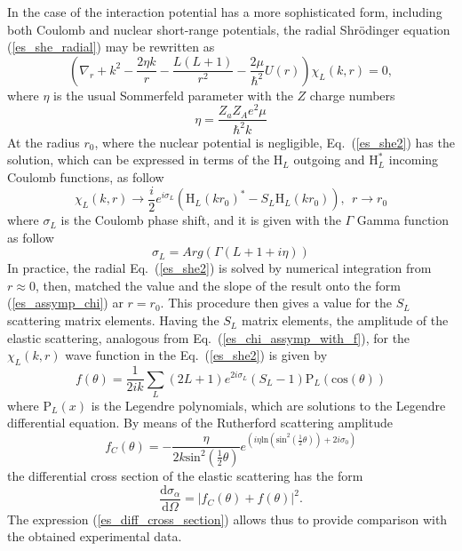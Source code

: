 \documentclass[
12pt, %
oneside, %
english, %
onehalfspacing, %
onehalfspacing, %
headsepline, %
]{MastersDoctoralThesis} %
\begin{document}
In the case of the interaction potential has a more sophisticated form, including both Coulomb and nuclear short-range  potentials, the radial Shr\"{o}dinger equation (\ref{es_she_radial}) may be rewritten as
\begin{equation}
\left( \nabla_r + k^2 - \frac{2 \eta k}{r} - \frac{L(L+1)}{r^2} - \frac{2 \mu}{\hbar^2} U \left( r \right) \right) \chi_L \left( k,r \right) =0,
\label{es_she2}
\end{equation}
where $\eta$ is the usual Sommerfeld parameter with the $Z$ charge numbers
\begin{equation*}
\eta=\frac{Z_a Z_A e^2 \mu}{\hbar^2 k}
\end{equation*}
At the radius $r_0$, where the nuclear potential is negligible, Eq.~(\ref{es_she2}) has the solution, which can be expressed in terms of the $\text{H}_L$ outgoing  and $\text{H}_L^*$ incoming Coulomb functions, as follow
\begin{equation}
\chi_L \left( k,r \right) \rightarrow \frac{i}{2}e^{i \sigma_L} \left( \text{H}_L(kr_0)^*
-S_L \text{H}_L(kr_0)\right), 
~~ r \rightarrow r_0
\label{es_assymp_chi}
\end{equation} 
where $\sigma_L$ is the Coulomb phase shift, and it is given with the $\Gamma$ Gamma function as follow
\begin{equation*}
\sigma_L=Arg\left( \Gamma \left( L+1+i \eta \right) \right)
\end{equation*}
In practice, the radial Eq.~(\ref{es_she2}) is solved by numerical integration from $r \approx 0$, then, matched the value and the slope of the result onto the form (\ref{es_assymp_chi}) ar $r=r_0$. This procedure then gives a value for the $S_L$ scattering matrix elements. Having the $S_L$ matrix elements, the amplitude  of the elastic scattering, analogous  from Eq.~(\ref{es_chi_assymp_with_f}), for the $\chi_L \left( k,r \right)$ wave function in the Eq.~(\ref{es_she2}) is given by
\begin{equation}
f(\theta)=\frac{1}{2ik} \sum_{L} (2L+1) e^{2i\sigma_L} \left( S_L - 1 \right)
\text{P}_L(\text{cos}(\theta))
\label{es_amplitude_nuclear}
\end{equation}
where $\text{P}_L(x)$ is the Legendre polynomials, which are solutions to the Legendre differential equation.
By means of the Rutherford scattering amplitude 
\begin{equation}
f_C(\theta)=-\frac{\eta}{2 k {\text{sin}}^2 \left( \tfrac{1}{2} \theta \right) }
e^{\left( i \eta \text{ln}\left( \text{sin}^2 \left( \tfrac{1}{2} \theta \right) \right)
+2i \sigma_{0} \right)}
\end{equation}
the differential cross section of the elastic scattering has the form
\begin{equation}
\frac{\text{d} \sigma_{\alpha}}{\text{d} \Omega} = \vert f_C(\theta) + f(\theta) \vert^2.
\label{es_diff_cross_section}
\end{equation} 
The expression (\ref{es_diff_cross_section}) allows thus to provide comparison with the obtained  experimental data.   
\end{document}
